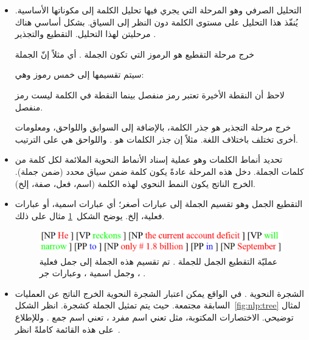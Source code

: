 \begin{itemize}
	\item 

التحليل الصرفي  وهو المرحلة التي يجري فيها تحليل الكلمة إلى مكوناتها الأساسية.
يُنفّذ هذا التحليل على مستوى الكلمة دون النظر إلى السياق.
بشكل أساسي هناك مرحليتن لهذا التحليل. التقطيع  والتجذير .

خرج مرحلة التقطيع هو الرموز التي تكون الجملة .
أي مثلاً إنّ الجملة \\
\centerline{  }
سيتم تقسيمها إلى خمس رموز وهي:\\
\centerline{  }
لاحظ أن النقطة الأخيرة تعتبر رمز منفصل بينما النقطة في الكلمة  ليست رمز منفصل.

خرج مرحلة التجذير هو جذر الكلمة، بالإضافة إلى السوابق واللواحق، ومعلومات أخرى تختلف باختلاف اللغة.
مثلاً إن جذر الكلمات
هو .
واللواحق هي
على الترتيب.


\item
تحديد أنماط الكلمات  وهو عملية إسناد الأنماط النحوية الملائمة لكل كلمة من كلمات الجملة.
دخل هذه المرحلة عادةً يكون كلمة ضمن سياق محدد (ضمن جملة).
الخرج الناتج يكون النمط النحوي لهذه الكلمة (اسم، فعل، صفة، إلخ).

\item
التقطيع الجمل  وهو تقسيم الجملة إلى عبارات أصغر؛ أي عبارات اسمية، أو عبارات فعلية، إلخ.
يوضح الشكل~\ref{fig:nlp:chunking} مثال على ذلك.

 \begin{figure}[htb]
	\centering
	\includegraphics[width=0.7\linewidth]{images/nlp-chunking2.PNG}
	\caption[%
		مثال عن عملية التقطيع الجمل.
	]{%
		عمليّة التقطيع الجمل للجملة
		. تم تقسيم هذه الجملة إلى جمل فعلية
		، وجمل اسمية
		، وعبارات جر
		.
	}
	\label{fig:nlp:chunking}
\end{figure}

\item
الشجرة النحوية .
في الواقع يمكن اعتبار الشجرة النحوية الخرج الناتج عن العمليات السابقة مجتمعة.
حيث يتم تمثيل الجملة كشجرة.
انظر الشكل~\ref{fig:nlp:tree} لمثال توضيحي.
الاختصارات المكتوبة،
مثل  تعني اسم مفرد ،
تعني اسم جمع .
وللإطلاع على هذه القائمة كاملةً انظر~\cite{penntreebank}.



\end{itemize}
